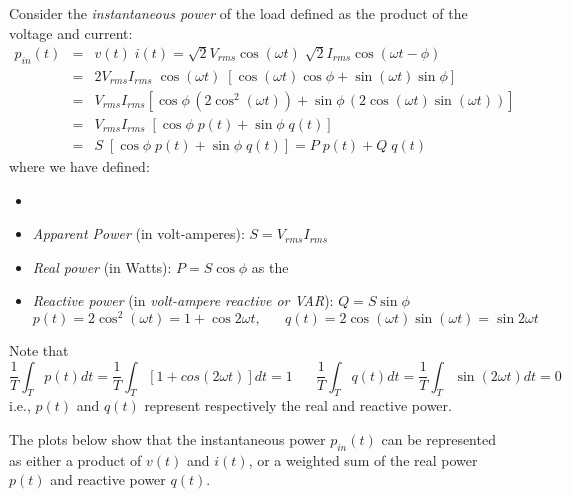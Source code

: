 \documentclass{article}
\begin{document}
Consider the {\em instantaneous power} of the load defined as the product
of the voltage and current:
\begin{eqnarray}
  p_{in}(t) &=&
  v(t)\;i(t)=\sqrt{2}V_{rms}\cos(\omega t)\;\sqrt{2}I_{rms}\cos(\omega t-\phi)
  \nonumber \\
  &=&2V_{rms}I_{rms}\;\cos(\omega t)\;[\cos(\omega t)\cos\phi
    +\sin(\omega t)\sin\phi ]	
  \nonumber \\
  &=&V_{rms}I_{rms} \left[\cos\phi\, \left(2\cos^2(\omega t)\right)
  +\sin\phi\,\left(2\cos(\omega t)\sin(\omega t)\right) \right] 
  \nonumber \\
  &=&V_{rms}I_{rms} \;\left[ \cos\phi\; p(t) + \sin\phi\; q(t) \right] 
  \nonumber \\
  &=& S \;\left[\cos\phi\; p(t) + \sin\phi\; q(t) \right] 	
  =P\; p(t)+Q\; q(t)
\end{eqnarray}
where we have defined:
\begin{itemize}
\item 
\item {\em Apparent Power} (in volt-amperes): $S=V_{rms}I_{rms}$
\item {\em Real power} (in Watts): $P=S\cos\phi$ as the 
\item {\em Reactive power} (in {\em volt-ampere reactive or 
  {\em VAR}}): $Q=S\sin\phi$
  \begin{equation}
    p(t)=2\cos^2(\omega t)=1+\cos 2\omega t,\;\;\;\;\;\;
    q(t)=2\cos(\omega t)\sin(\omega t)=\sin 2\omega t
  \end{equation}
\end{itemize}
Note that
\begin{equation}
  \frac{1}{T}\int_T p(t)dt=\frac{1}{T}\int_T [1+cos(2\omega t)] dt=1	
  \;\;\;\;\;\;
  \frac{1}{T}\int_T q(t)dt=\frac{1}{T}\int_T \sin(2\omega t) dt=0	
\end{equation}
i.e., $p(t)$ and $q(t)$ represent respectively the real and reactive 
power. 

The plots below show that the instantaneous power $p_{in}(t)$ can be 
represented as either a product of $v(t)$ and $i(t)$, or a weighted 
sum of the real power $p(t)$ and reactive power $q(t)$.

\end{document}
